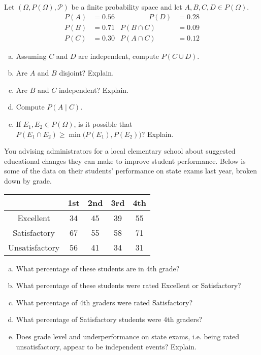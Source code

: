 \documentclass[11pt,letterpaper]{article}
\begin{document}

 Let $(\Omega, P(\Omega), \mathcal{P})$ be a finite probability space and let $A, B, C, D \in P(\Omega)$. 
	\[
	\begin{aligned}
	P(A)&= 0.56 &\qquad\qquad P(D)&= 0.28 \\
	P(B)&= 0.71 & P(B \cap C)&= 0.09 \\
	P(C)&= 0.30 & P(A \cap C)&= 0.12
	\end{aligned}
	\]

\begin{enumerate}[(a)]
\item Assuming $C$ and $D$ are independent, compute $P(C \cup D)$.
\item Are $A$ and $B$ disjoint? Explain. 
\item Are $B$ and $C$ independent? Explain.
\item Compute $P(A \;|\; C)$. 
\item If $E_1, E_2 \in P(\Omega)$, is it possible that $P(E_1 \cap E_2) \geq \min \big( P(E_1), P(E_2) \big)$? Explain.
\end{enumerate}



\newpage



 You advising administrators for a local elementary school about suggested educational changes they can make to improve student performance. Below is some of the data on their students' performance on state exams last year, broken down by grade. \par
	\begin{table}[H]
	\centering
	\begin{tabular}{|c||c|c|c|c|} \hline
	& 1st & 2nd & 3rd & 4th \\ \hline
	Excellent & 34 & 45 & 39 & 55 \\ \hline
	Satisfactory & 67 & 55 & 58 & 71 \\ \hline
	Unsatisfactory & 56 & 41 & 34 & 31 \\ \hline
	\end{tabular}
	\end{table}

\begin{enumerate}[(a)]
\item What percentage of these students are in 4th grade?
\item What percentage of these students were rated Excellent or Satisfactory? 
\item What percentage of 4th graders were rated Satisfactory?
\item What percentage of Satisfactory students were 4th graders?
\item Does grade level and underperformance on state exams, i.e. being rated unsatisfactory, appear to be independent events? Explain. 
\end{enumerate}
\end{document}
